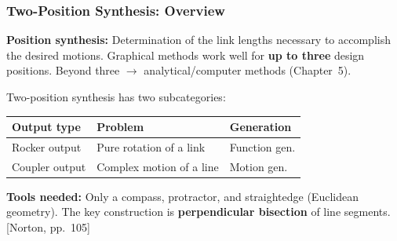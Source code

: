 \documentclass[10pt,aspectratio=43]{beamer}
\newcommand{\pref}[1]{\vfill\hfill{\scriptsize\color{gray}[Norton, pp.~#1]}}
\begin{document}
\begin{frame}
\frametitle{Two-Position Synthesis: Overview}

\begin{yellowbox}
\textbf{Position synthesis:} Determination of the link lengths necessary to accomplish the desired motions. Graphical methods work well for \textbf{up to three} design positions. Beyond three $\to$ analytical/computer methods (Chapter~5).
\end{yellowbox}

\vspace{6pt}
Two-position synthesis has two subcategories:

\begin{center}
\begin{tabular}{l|l|l}
\toprule
\textbf{Output type} & \textbf{Problem} & \textbf{Generation} \\
\midrule
Rocker output & Pure rotation of a link & Function gen. \\
Coupler output & Complex motion of a line & Motion gen. \\
\bottomrule
\end{tabular}
\end{center}

\vspace{4pt}
\textbf{Tools needed:} Only a compass, protractor, and straightedge (Euclidean geometry). The key construction is \textbf{perpendicular bisection} of line segments.
\pref{105}
\end{frame}
\end{document}
